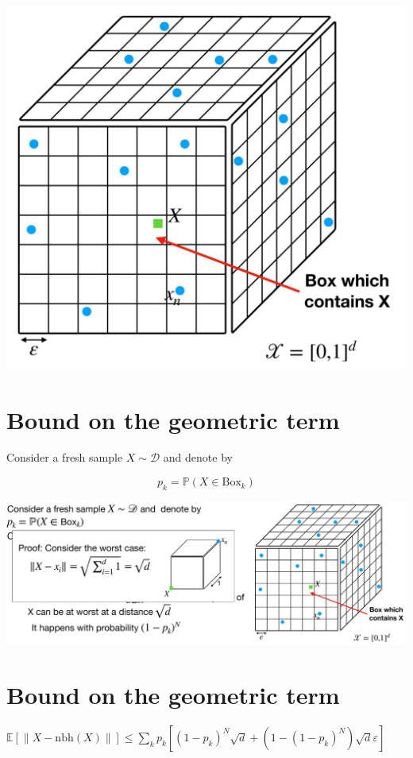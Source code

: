 \documentclass[10pt]{article}
\begin{document}
\begin{center}
\includegraphics[max width=\textwidth]{2023_12_30_f937b0007b5d87b39f79g-37}
\end{center}

\section*{Bound on the geometric term}
Consider a fresh sample $X \sim \mathscr{D}$ and denote by

$$
p_{k}=\mathbb{P}\left(X \in \mathrm{Box}_{k}\right)
$$

\begin{center}
\includegraphics[max width=\textwidth]{2023_12_30_f937b0007b5d87b39f79g-38}
\end{center}

\section*{Bound on the geometric term}
$\mathbb{E}[\|X-\mathrm{nbh}(X)\|] \leq \sum_{k} p_{k}\left[\left(1-p_{k}\right)^{N} \sqrt{d}+\left(1-\left(1-p_{k}\right)^{N}\right) \sqrt{d} \varepsilon\right]$
\end{document}
